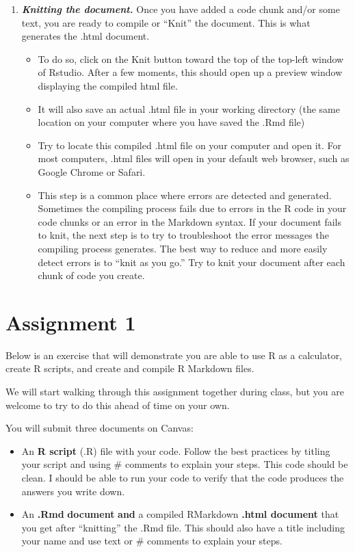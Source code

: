 \documentclass[
  letterpaper,
  DIV=11,
  numbers=noendperiod]{scrreprt}
\providecommand{\tightlist}{%
  \setlength{\itemsep}{0pt}\setlength{\parskip}{0pt}}\usepackage{longtable,booktabs,array}
\begin{document}
\begin{enumerate}
\def\labelenumi{\arabic{enumi}.}
\setcounter{enumi}{6}
\tightlist
\item
  \textbf{\emph{Knitting the document.}} Once you have added a code
  chunk and/or some text, you are ready to compile or ``Knit'' the
  document. This is what generates the .html document.

  \begin{itemize}
  \tightlist
  \item
    To do so, click on the Knit button toward the top of the top-left
    window of Rstudio. After a few moments, this should open up a
    preview window displaying the compiled html file.
  \item
    It will also save an actual .html file in your working directory
    (the same location on your computer where you have saved the .Rmd
    file)
  \item
    Try to locate this compiled .html file on your computer and open it.
    For most computers, .html files will open in your default web
    browser, such as Google Chrome or Safari.
  \item
    This step is a common place where errors are detected and generated.
    Sometimes the compiling process fails due to errors in the R code in
    your code chunks or an error in the Markdown syntax. If your
    document fails to knit, the next step is to try to troubleshoot the
    error messages the compiling process generates. The best way to
    reduce and more easily detect errors is to ``knit as you go.'' Try
    to knit your document after each chunk of code you create.
  \end{itemize}
\end{enumerate}

\hypertarget{assignment-1}{%
\section{Assignment 1}\label{assignment-1}}

Below is an exercise that will demonstrate you are able to use R as a
calculator, create R scripts, and create and compile R Markdown files.

We will start walking through this assignment together during class, but
you are welcome to try to do this ahead of time on your own.

You will submit three documents on Canvas:

\begin{itemize}
\tightlist
\item
  An \textbf{R script} (.R) file with your code. Follow the best
  practices by titling your script and using \# comments to explain your
  steps. This code should be clean. I should be able to run your code to
  verify that the code produces the answers you write down.
\item
  An \textbf{.Rmd} \textbf{document} \textbf{and} a compiled RMarkdown
  \textbf{.html document} that you get after ``knitting'' the .Rmd file.
  This should also have a title including your name and use text or \#
  comments to explain your steps.
\end{itemize}
\end{document}
